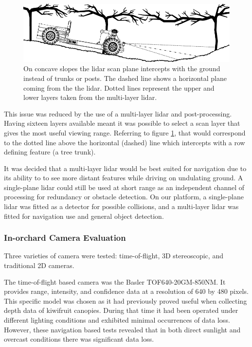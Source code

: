 \documentclass[preprint,authoryear,12pt]{elsarticle}
\begin{document}
        \begin{figure}[htb]
            \centering
            \includegraphics[width=\linewidth]{imgs/concave_slope/concave_slope_v4.pdf}
            \caption{
                On concave slopes the lidar scan plane intercepts with the ground instead of trunks or posts.
                The dashed line shows a horizontal plane coming from the the lidar.
                Dotted lines represent the upper and lower layers taken from the multi-layer lidar.
            }
            \label{fig:concaveSlope}
        \end{figure}

        This issue was reduced by the use of a multi-layer lidar and post-processing.
        Having sixteen layers available meant it was possible to select a scan layer that gives the most useful viewing range.
        Referring to figure \ref{fig:concaveSlope}, that would correspond to the dotted line above the horizontal (dashed) line which intercepts with a row defining feature (a tree trunk).

        It was decided that a multi-layer lidar would be best suited for navigation due to its ability to to see more distant features while driving on undulating ground.
        A single-plane lidar could still be used at short range as an independent channel of processing for redundancy or obstacle detection.
        On our platform, a single-plane lidar was fitted as a detector for possible collisions, and a multi-layer lidar was fitted for navigation use and general object detection.


    \subsubsection{In-orchard Camera Evaluation}
        \label{sect:camera_evaluation}

        Three varieties of camera were tested: time-of-flight, 3D stereoscopic, and traditional 2D cameras.

        The time-of-flight based camera was the Basler TOF640-20GM-850NM.
        It provides range, intensity, and confidence data at a resolution of 640 by 480 pixels.
        This specific model was chosen as it had previously proved useful when collecting depth data of kiwifruit canopies.
        During that time it had been operated under different lighting conditions and exhibited minimal occurrences of data loss.
        However, these navigation based tests revealed that in both direct sunlight and overcast conditions there was significant data loss.
\end{document}
